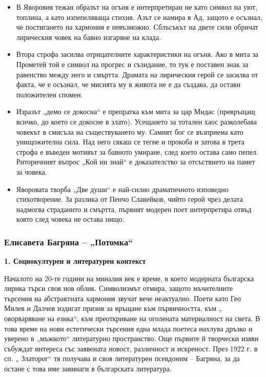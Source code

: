 \documentclass[12pt,a4paper]{article}
\begin{document}
\vspace{0.1cm}
\begin{itemize}[leftmargin=*, noitemsep, topsep=2pt, parsep=0pt] 
    \item В Яворовия тежан образът на огъня е интерпретиран не като символ на уют, топлина, а като изпепеляваща стихия. Азът се намира в Ад, защото е осъзнал, че постигането на хармония е невъзможно. Сблъсъкът на двете сили обричат лирическия човек на бавно изгаряне на клада.
    \vspace{0.1cm}
    \item Втора строфа засилва отрицателните характеристики на огъня. Ако в мита за Прометей той е символ на прогрес и съзидание, то тук е поставен знак за равенство между него и смъртта. Драмата на лирическия герой се засилва от факта, че е осъзнал, че мисията му в живота не е да създава, да остави положителен спомен.
    \vspace{0.1cm}
    \item Изразът „демо се докосна“ е препратка към мита за цар Мидас (превръщащ всичко, до което се докосне в злато). Усещането за тотален хаос разколебава човекът в смисъла на съществуването му. Самият бог се възприема като унищожителна сила. Над него сякаш се тегне и прокоба и затова в трета строфа е въведен мотивът за бавното умиране, след което остава само пепел. Риторичният въпрос „Кой ни знай“ е доказателство за отсъствието на памет за човека.
    \vspace{0.1cm}
    \item Яворовата творба „Две души“ е най-силно драматичното изповедно стихотворение. За разлика от Пенчо Славейков, чийто герой чрез делата надмогва страданито и смъртта, първият модерен поет интерпретира отвъд която след човека не остава нищо.
\end{itemize}

\newpage

\subsubsection{\colorbox{green!40}{Елисавета Багряна – „Потомка“}}

\textbf{1. Социокултурен и литературен контекст}
\vspace{0.1cm}
 
\indent Началото на 20-те години на миналия век е време, в което модерната българска лирика търси своя
нов облик. Символизмът отмира, защото мъчителните търсения на абстрактната хармония звучат
вече неактуално. Поети като Гео Милев и Далчев издигат призив за връщане към първичността, към
„ оворваряване на езика“, към преоткриване на оголената материалност на света. В това време на
нови естетически търсения една млада поетеса нахлува дръзко и уверено в „мъжкото“ литературно
пространство. Още първите й творчески изяви събуждат интереса със заявената новост, различност
и искреност. През 1922 г. в сп. „ Златорог“ тя получава и своя литературен псевдоним – Багряна, за
да остане с това име завинаги в българската литература.
\end{document}
